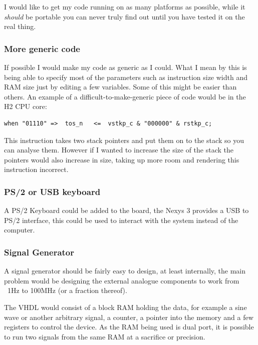 \documentclass	[a4paper, 10pt]	{article}
\begin{document}
      I would like to get my code running on as many platforms as possible, while it
      \emph{should} be portable you can never truly find out until you have tested
      it on the real thing.

      \subsubsection{More generic code}

        If possible I would make my code as generic as I could. What I mean by this
        is being able to specify most of the parameters such as instruction size
        width and RAM size just by editing a few variables. Some of this might be
        easier than others. An example of a difficult-to-make-generic piece of code
        would be in the H2 CPU core:

        
\begin{lstlisting}
when "01110" =>  tos_n   <=  vstkp_c & "000000" & rstkp_c; 
\end{lstlisting}

        This instruction takes two stack pointers and put them on to the stack so
        you can analyse them. However if I wanted to increase the size of the
        stack the pointers would also increase in size, taking up more room and
        rendering this instruction incorrect.

      \subsubsection{PS/2 or USB keyboard}

      A PS/2 Keyboard could be added to the board, the Nexys 3 provides a USB
      to PS/2 interface, this could be used to interact with the system instead
      of the computer.

      \subsubsection{Signal Generator}

      A signal generator should be fairly easy to design, at least internally, the
      main problem would be designing the external analogue components to work from
      ~1Hz to 100MHz (or a fraction thereof).

      The VHDL would consist of a block RAM holding the data, for example a sine wave
      or another arbitrary signal, a counter, a pointer into the memory and a few
      registers to control the device. As the RAM being used is dual port, it is
      possible to run two signals from the same RAM at a sacrifice or precision.
\end{document}

